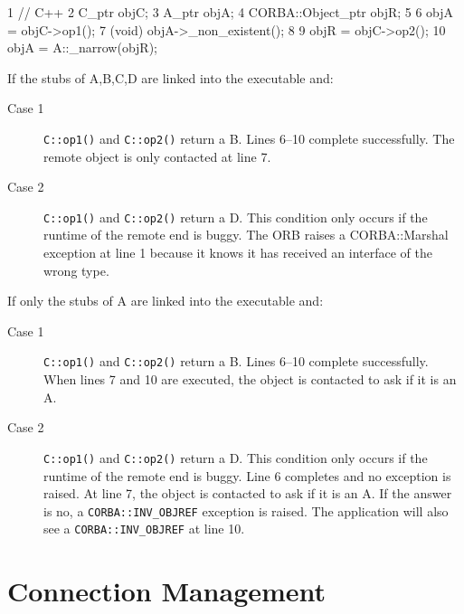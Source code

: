 \documentclass[11pt,twoside,a4paper]{book}
\newcommand{\code}[1]{\texttt{#1}}
\newcommand{\op}[1]{\texttt{#1()}}
\begin{document}
\lstset{labelstep=1,gobble=4}
\begin{cxxlisting}
 1  // C++
 2  C_ptr objC;
 3  A_ptr objA;
 4  CORBA::Object_ptr objR;
 5
 6  objA =  objC->op1();
 7  (void) objA->_non_existent();
 8
 9  objR =  objC->op2();
10  objA =  A::_narrow(objR);
\end{cxxlisting}
\lstset{labelstep=0,gobble=0}

\noindent If the stubs of A,B,C,D are linked into the executable and:

\begin{description}
\item[Case 1] \op{C::op1} and \op{C::op2} return a B. Lines 6--10
complete successfully. The remote object is only contacted at line 7.

\item[Case 2] \op{C::op1} and \op{C::op2} return a D. This condition
only occurs if the runtime of the remote end is buggy. The ORB raises
a CORBA::Marshal exception at line 1 because it knows it has received
an interface of the wrong type.
\end{description}

\noindent If only the stubs of A are linked into the executable and:

\begin{description}
\item[Case 1] \op{C::op1} and \op{C::op2} return a B. Lines 6--10
complete successfully. When lines 7 and 10 are executed, the object is
contacted to ask if it is an A.

\item[Case 2] \op{C::op1} and \op{C::op2} return a D. This condition
only occurs if the runtime of the remote end is buggy. Line 6
completes and no exception is raised. At line 7, the object is
contacted to ask if it is an A. If the answer is no, a
\code{CORBA::INV\_OBJREF} exception is raised. The application will
also see a \code{CORBA::INV\_OBJREF} at line 10.
\end{description}









\chapter{Connection Management}
\label{ch_conn}
\end{document}
